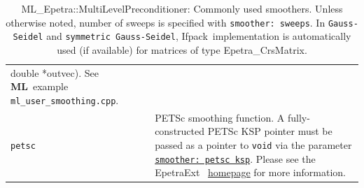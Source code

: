 \documentclass{article}[11pt]
\newcommand{\epetraext}  {{\sc EpetraExt}}
\newcommand{\ML}     {{\bf ML}}
\newcommand{\ifpack}  {{\sc Ifpack}}
\newcommand \trilinosWeb {trilinos.sandia.gov}
\begin{document}
\begin{table}[tbh]
\begin{center}
\begin{tabular}{ | p{4.5cm} | p{10cm} | }
{ double *outvec)}.  See \ML\ example {\tt ml\_user\_smoothing.cpp}.\\
%
\verb!petsc!              & PETSc smoothing function.  A fully-constructed PETSc KSP pointer
must be passed as a pointer to {\tt void} via the parameter
\hyperlink{petscksp}{{\tt smoother: petsc ksp}}.  Please see the \epetraext~
\href{http://\trilinosWeb/packages/epetraext}{homepage} for
more information.
\\
\hline
\end{tabular}
\caption{{\sf ML\_Epetra::MultiLevelPreconditioner}: Commonly used smoothers.
Unless otherwise noted, number of sweeps is specified with {\tt smoother: sweeps}.
In {\tt Gauss-Seidel} and {\tt symmetric Gauss-Seidel},
\ifpack\ implementation is automatically used (if available)
for matrices of type Epetra\_CrsMatrix.}
\label{tab:ml:smoother}
\end{center}
\end{table}
\end{document}
